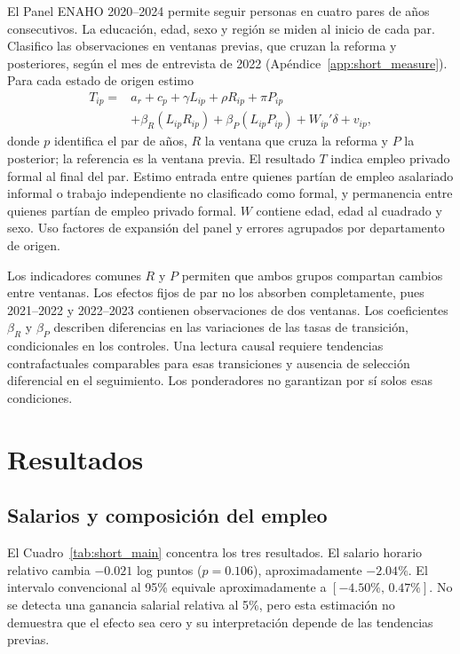 El Panel ENAHO 2020--2024 permite seguir personas en cuatro pares de años consecutivos. La educación, edad, sexo y región se miden al inicio de cada par. Clasifico las observaciones en ventanas previas, que cruzan la reforma y posteriores, según el mes de entrevista de 2022 (Apéndice~\ref{app:short_measure}). Para cada estado de origen estimo
\begin{equation}
\begin{split}
T_{ip}={}&a_r+c_p+\gamma L_{ip}+\rho R_{ip}+\pi P_{ip}\\
&+\beta_R(L_{ip}R_{ip})+\beta_P(L_{ip}P_{ip})+W_{ip}'\delta+v_{ip},
\end{split}
\label{eq:journal_panel}
\end{equation}
donde $p$ identifica el par de años, $R$ la ventana que cruza la reforma y $P$ la posterior; la referencia es la ventana previa. El resultado $T$ indica empleo privado formal al final del par. Estimo entrada entre quienes partían de empleo asalariado informal o trabajo independiente no clasificado como formal, y permanencia entre quienes partían de empleo privado formal. $W$ contiene edad, edad al cuadrado y sexo. Uso factores de expansión del panel y errores agrupados por departamento de origen.

Los indicadores comunes $R$ y $P$ permiten que ambos grupos compartan cambios entre ventanas. Los efectos fijos de par no los absorben completamente, pues 2021--2022 y 2022--2023 contienen observaciones de dos ventanas. Los coeficientes $\beta_R$ y $\beta_P$ describen diferencias en las variaciones de las tasas de transición, condicionales en los controles. Una lectura causal requiere tendencias contrafactuales comparables para esas transiciones y ausencia de selección diferencial en el seguimiento. Los ponderadores no garantizan por sí solos esas condiciones.

\section{Resultados}

\subsection{Salarios y composición del empleo}

El Cuadro~\ref{tab:short_main} concentra los tres resultados. El salario horario relativo cambia $-0.021$ log puntos ($p=0.106$), aproximadamente $-2.04\%$. El intervalo convencional al 95\% equivale aproximadamente a $[-4.50\%,\,0.47\%]$. No se detecta una ganancia salarial relativa al 5\%, pero esta estimación no demuestra que el efecto sea cero y su interpretación depende de las tendencias previas.

